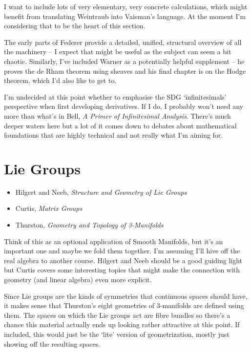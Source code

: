 \documentclass[article]{article}
\begin{document}
I want to include lots of very elementary, very concrete calculations, which might benefit from translating Weintraub into Vaisman's language. At the moment I'm considering that to be the heart of this section.

The early parts of Federer provide a detailed, unified, structural overview of all the machinery -- I expect that might be useful as the subject can seem a bit chaotic. Similarly, I've included Warner as a potentially helpful supplement -- he proves the de Rham theorem using sheaves and his final chapter is on the Hodge theorem, which I'd also like to get to.

I'm undecided at this point whether to emphasise the SDG `infinitesimals' perspective when first developing derivatives. If I do, I probably won't need any more than what's in Bell, \textit{A Primer of Infinitesimal Analysis}. There's much deeper waters here but a lot of it comes down to debates about mathematical foundations that are highly technical and not really what I'm aiming for.

\section{Lie Groups}

\begin{itemize}
	\item{Hilgert and Neeb, \textit{Structure and Geometry of Lie Groups}}
	\item{Curtis, \textit{Matrix Groups}}
	\item{Thurston, \textit{Geometry and Topology of 3-Manifolds}}
\end{itemize}

Think of this as an optional application of Smooth Manifolds, but it's an important one and maybe we fold them together. I'm assuming I'll hive off the real algebra to another course. Hilgert and Neeb should be a good guiding light but Curtis covers some interesting topics that might make the connection with geometry (and linear algebra) even more explicit. 

Since Lie groups are the kinds of symmetries that continuous spaces should have, it makes sense that Thurston's eight geometries of 3-manifolds are defined using them. The spaces on which the Lie groups act are fibre bundles so there's a chance this material actually ends up looking rather attractive at this point. If included, this would just be the `lite' version of geometrization, mostly just showing off the resulting spaces.
\end{document}
